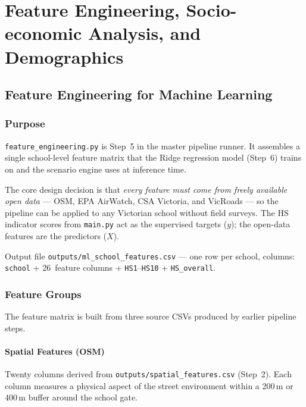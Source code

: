 \documentclass[11pt,a4paper,openany]{book}
\begin{document}
\part{Feature Engineering, Socio-economic Analysis, and Demographics}

\chapter{Feature Engineering for Machine Learning}

\section{Purpose}

\texttt{feature\_engineering.py} is Step~5 in the master pipeline runner.  It assembles
a single school-level feature matrix that the Ridge regression model (Step~6) trains on
and the scenario engine uses at inference time.

The core design decision is that \emph{every feature must come from freely available open
data} --- OSM, EPA AirWatch, CSA Victoria, and VicRoads --- so the pipeline can be applied
to any Victorian school without field surveys.  The HS indicator scores from \texttt{main.py}
act as the supervised targets ($y$); the open-data features are the predictors ($X$).

\begin{keybox}{Output file}
\texttt{outputs/ml\_school\_features.csv} --- one row per school, columns:
\texttt{school} + 26~feature columns + \texttt{HS1}--\texttt{HS10} + \texttt{HS\_overall}.
\end{keybox}

\section{Feature Groups}

The feature matrix is built from three source CSVs produced by earlier pipeline steps.

\subsection{Spatial Features (OSM)}

Twenty columns derived from \texttt{outputs/spatial\_features.csv} (Step~2).  Each column
measures a physical aspect of the street environment within a 200\,m or 400\,m buffer
around the school gate.
\end{document}
